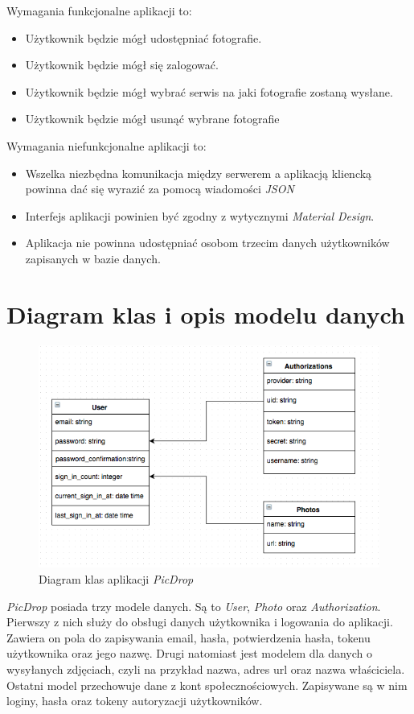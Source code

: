 \documentclass[openright]{xmgr}
\begin{document}
 Wymagania funkcjonalne aplikacji to: 
\begin{itemize}
  \item Użytkownik będzie mógł udostępniać fotografie. 
  \item Użytkownik będzie mógł się zalogować.
  \item Użytkownik będzie mógł wybrać serwis na jaki fotografie zostaną wysłane.
  \item Użytkownik będzie mógł usunąć wybrane fotografie
\end{itemize}

Wymagania niefunkcjonalne aplikacji to: 
\begin{itemize}
  \item Wszelka niezbędna komunikacja między serwerem a aplikacją kliencką powinna dać się wyrazić za pomocą wiadomości \textit{JSON}
  \item Interfejs aplikacji powinien być zgodny z wytycznymi \textit{Material Design}.
  \item Aplikacja nie powinna udostępniać osobom trzecim danych użytkowników zapisanych w bazie danych.
\end{itemize}
  
\section{Diagram klas i opis modelu danych}
\begin{figure}[H]
\centering
\includegraphics[width=1\hsize]{images/diagram_klas.png}
\caption{Diagram klas aplikacji \textit{PicDrop}\label{RYS.1}}
\end{figure}
\textit{PicDrop} posiada trzy modele danych. Są to \textit{User}, \textit{Photo} oraz \textit{Authorization}. Pierwszy z nich służy do obsługi danych użytkownika i logowania do aplikacji. Zawiera on pola do zapisywania email, hasła, potwierdzenia hasła, tokenu użytkownika oraz jego nazwę. Drugi natomiast jest modelem dla danych o wysyłanych zdjęciach, czyli na przykład nazwa, adres url oraz nazwa właściciela. Ostatni model przechowuje dane z kont społecznościowych. Zapisywane są w nim loginy, hasła oraz tokeny autoryzacji użytkowników. 
\end{document}
